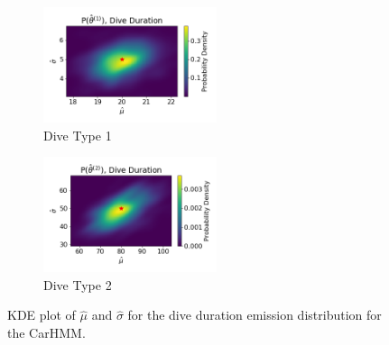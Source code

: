 \begin{figure}[ht]
    \centering
    \begin{subfigure}[t]{0.4\textwidth}
        \centering
        \includegraphics[width=2in]{../Plots/hhmm_FV_MLE_density_dive_duration_-1_0.png}
        \caption{Dive Type 1}
    \end{subfigure}
    \begin{subfigure}[t]{0.4\textwidth}
        \centering
        \includegraphics[width=2in]{../Plots/hhmm_FV_MLE_density_dive_duration_-1_1.png}
        \caption{Dive Type 2}
    \end{subfigure}
	\caption{KDE plot of $\hat \mu$ and $\hat \sigma$ for the dive duration emission distribution for the CarHMM.}
	\label{fig:MLE_dist}
\end{figure}


